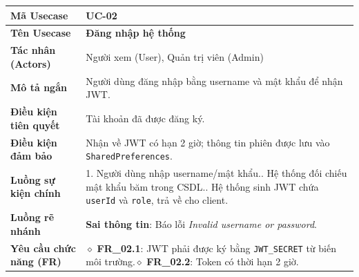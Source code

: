 \begin{table}[H]
\renewcommand{\arraystretch}{1.3}
\centering
\begin{tabularx}{\textwidth}{|p{4.5cm}|X|}
\hline
\cellcolor{gray!15}\bfseries Mã Usecase & \textbf{UC-02} \\ \hline
\cellcolor{gray!15}\bfseries Tên Usecase & \textbf{Đăng nhập hệ thống} \\ \hline
\cellcolor{gray!15}\bfseries Tác nhân (Actors) & Người xem (User), Quản trị viên (Admin) \\ \hline
\cellcolor{gray!15}\bfseries Mô tả ngắn & Người dùng đăng nhập bằng username và mật khẩu để nhận JWT. \\ \hline
\cellcolor{gray!15}\bfseries Điều kiện tiên quyết & Tài khoản đã được đăng ký. \\ \hline
\cellcolor{gray!15}\bfseries Điều kiện đảm bảo & Nhận về JWT có hạn 2 giờ; thông tin phiên được lưu vào \texttt{SharedPreferences}. \\ \hline
\cellcolor{gray!15}\bfseries Luồng sự kiện chính & 1. Người dùng nhập username/mật khẩu.\newline 2. Hệ thống đối chiếu mật khẩu băm trong CSDL.\newline 3. Hệ thống sinh JWT chứa \texttt{userId} và \texttt{role}, trả về cho client. \\ \hline
\cellcolor{gray!15}\bfseries Luồng rẽ nhánh & \textbf{Sai thông tin}: Báo lỗi \textit{Invalid username or password}. \\ \hline
\cellcolor{gray!15}\bfseries Yêu cầu chức năng (FR) & $\diamond$ \textbf{FR\_02.1}: JWT phải được ký bằng \texttt{JWT\_SECRET} từ biến môi trường.\newline $\diamond$ \textbf{FR\_02.2}: Token có thời hạn 2 giờ. \\ \hline
\end{tabularx}
\end{table}

